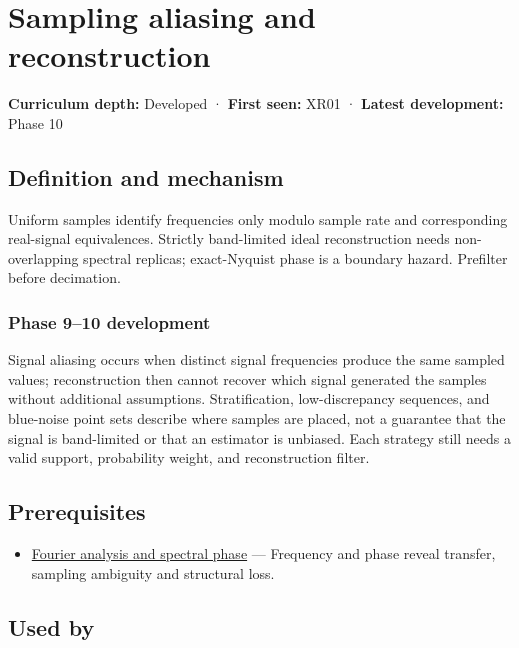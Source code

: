 \hypertarget{appendix-6a7869dd79a6}{}
\section{Sampling aliasing and reconstruction}\label{appendix-6a7869dd79a6-sampling-aliasing-and-reconstruction}

\textbf{Curriculum depth:} Developed · \textbf{First seen:} XR01 · \textbf{Latest development:} Phase 10

\subsection{Definition and mechanism}\label{appendix-6a7869dd79a6-definition-and-mechanism}

Uniform samples identify frequencies only modulo sample rate and corresponding real-signal equivalences. Strictly band-limited ideal reconstruction needs non-overlapping spectral replicas; exact-Nyquist phase is a boundary hazard. Prefilter before decimation.

\subsubsection{Phase 9--10 development}\label{appendix-6a7869dd79a6-phase-910-development}

Signal aliasing occurs when distinct signal frequencies produce the same sampled values; reconstruction then cannot recover which signal generated the samples without additional assumptions. Stratification, low-discrepancy sequences, and blue-noise point sets describe where samples are placed, not a guarantee that the signal is band-limited or that an estimator is unbiased. Each strategy still needs a valid support, probability weight, and reconstruction filter.

\subsection{Prerequisites}\label{appendix-6a7869dd79a6-prerequisites}

\begin{itemize}
\tightlist
\item
  \hyperref[appendix-b60686ba06a1]{Fourier analysis and spectral phase} --- Frequency and phase reveal transfer, sampling ambiguity and structural loss.
\end{itemize}

\subsection{Used by}\label{appendix-6a7869dd79a6-used-by}

